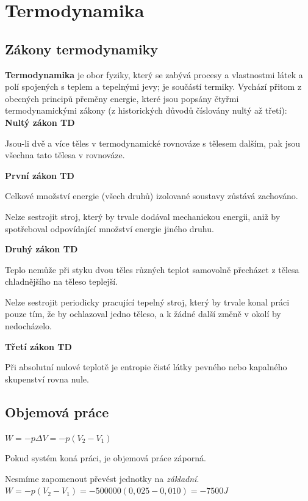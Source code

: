
\section{Termodynamika}

\subsection{Zákony termodynamiky}

\textbf{Termodynamika} je obor fyziky, který se zabývá procesy a vlastnostmi látek a polí spojených s teplem a tepelnými jevy; je součástí termiky. Vychází přitom z obecných principů přeměny energie, které jsou popsány čtyřmi termodynamickými zákony (z historických důvodů číslovány nultý až třetí):\\

\textbf{Nultý zákon TD}

Jsou-li dvě a více těles v termodynamické rovnováze s tělesem dalším, pak jsou všechna tato tělesa v rovnováze.

\textbf{První zákon TD}

Celkové množství energie (všech druhů) izolované soustavy zůstává zachováno.

Nelze sestrojit stroj, který by trvale dodával mechanickou energii, aniž by spotřeboval odpovídající množství energie jiného druhu.

\textbf{Druhý zákon TD}

Teplo nemůže při styku dvou těles různých teplot samovolně přecházet z tělesa chladnějšího na těleso teplejší.

Nelze sestrojit periodicky pracující tepelný stroj, který by trvale konal práci pouze tím, že by ochlazoval jedno těleso, a k žádné další změně v okolí by nedocházelo.

\textbf{Třetí zákon TD}

Při absolutní nulové teplotě je entropie čisté látky pevného nebo kapalného skupenství rovna nule.

\subsection{Objemová práce}
$W = - p\Delta V = - p(V_2 - V_1)$

Pokud systém koná práci, je objemová práce záporná.


Nesmíme zapomenout převést jednotky na \textit{základní}.
$W = - p(V_2 - V_1) = -500 000 (0,025 - 0,010) = -7500 J$

